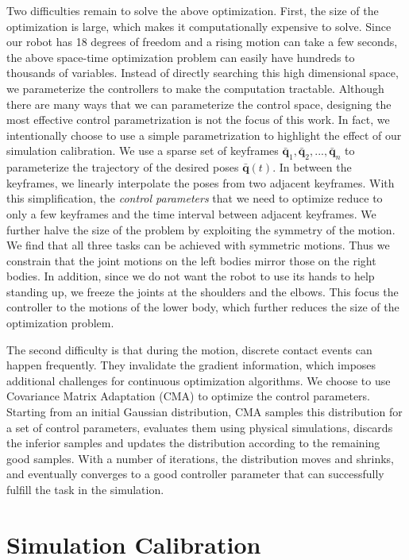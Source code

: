 Two difficulties remain to solve the above optimization. First, the size of the optimization is large, which makes it computationally expensive to solve. Since our robot has 18 degrees of freedom and a rising motion can take a few seconds, the above space-time optimization problem can easily have hundreds to thousands of variables. Instead of directly searching this high dimensional space, we parameterize the controllers to make the computation tractable. Although there are many ways that we can parameterize the control space, designing the most effective control parametrization is not the focus of this work. In fact, we intentionally choose to use a simple parametrization to highlight the effect of our simulation calibration. We use a sparse set of keyframes $\bar{\mathbf{q}}_1, \bar{\mathbf{q}}_2, ..., \bar{\mathbf{q}}_n$ to parameterize the trajectory of the desired poses $\bar{\mathbf{q}}(t)$. In between the keyframes, we linearly interpolate the poses from two adjacent keyframes. With this simplification, the \emph{control parameters} that we need to optimize reduce to only a few keyframes and the time interval between adjacent keyframes. We further halve the size of the problem by exploiting the symmetry of the motion. We find that all three tasks can be achieved with symmetric motions. Thus we constrain that the joint motions on the left bodies mirror those on the right bodies. In addition, since we do not want the robot to use its hands to help standing up, we freeze the joints at the shoulders and the elbows. This focus the controller to the motions of the lower body, which further reduces the size of the optimization problem.

The second difficulty is that during the motion, discrete contact events can happen frequently. They invalidate the gradient information, which imposes additional challenges for continuous optimization algorithms. We choose to use Covariance Matrix Adaptation (CMA) \cite{Hansen:2009} to optimize the control parameters. Starting from an initial Gaussian distribution, CMA samples this distribution for a set of control parameters, evaluates them using physical simulations, discards the inferior samples and updates the distribution according to the remaining good samples. With a number of iterations, the distribution moves and shrinks, and eventually converges to a good controller parameter that can successfully fulfill the task in the simulation.

\section{Simulation Calibration}

